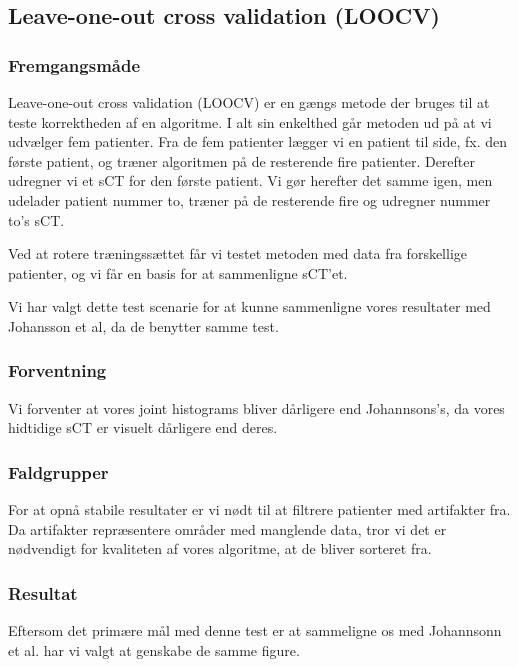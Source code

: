 
\subsection{Leave-one-out cross validation (LOOCV)}
\subsubsection{Fremgangsmåde}
Leave-one-out cross validation (LOOCV) er en gængs metode der bruges til at teste korrektheden af en algoritme. I alt sin enkelthed går metoden ud på at vi udvælger fem patienter. Fra de fem patienter lægger vi en patient til side, fx. den første patient, og træner algoritmen på de resterende fire patienter. Derefter udregner vi et sCT for den første patient. Vi gør herefter det samme igen, men udelader patient nummer to, træner på de resterende fire og udregner nummer to's sCT. 

Ved at rotere træningssættet får vi testet metoden med data fra forskellige patienter, og vi får en basis for at sammenligne sCT'et.

Vi har valgt dette test scenarie for at kunne sammenligne vores resultater med Johansson et al, da de benytter samme test.

\subsubsection{Forventning}
Vi forventer at vores joint histograms bliver dårligere end Johannsons's, da vores hidtidige sCT er visuelt dårligere end deres.


\subsubsection{Faldgrupper}
For at opnå stabile resultater er vi nødt til at filtrere patienter med artifakter fra. Da artifakter repræsentere områder med manglende data, tror vi det er nødvendigt for kvaliteten af vores algoritme, at de bliver sorteret fra.

\subsubsection{Resultat}

Eftersom det primære mål med denne test er at sammeligne os med Johannsonn et al. har vi valgt at genskabe de samme figure.

